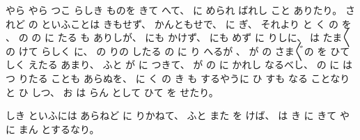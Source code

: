 %
やら
やら
つこ
らしき
ものを
きて
へて、
%
に
められ
ばれし
こと
ありたり。
%
されど
の
といふことは
きもせず、
%
かんともせで、
%
に
ぎ、
%
それより
と
く
の
を
%
、
%
の
の
に
たる
も
ありしが、
%
にも
かけず、
%
にも
めず
に
りしに、
%
は
たま〳〵
の
けて
らしく
に、
%
の
りの
したる
の
に
り
へるが
、
%
が
の
さま〴〵の
を
ひて
しく
えたる
あまり、
%
ふと
が
に
つきて、
%
が
の
に
かれし
なるべし、
%
の
に
は
つ
りたる
ことも
あらぬを、
%
に
く
の
き
も
するやうに
ひ
すも
なる
ことなりと
ひ
しつ、
%
お
は
らん
として
ひて
を
せたり。

%
しき
といふには
あらねど
に
りかねて、
%
ふと
また
を
けば、
%
は
き
に
きて
や
に
まん
とするなり。

